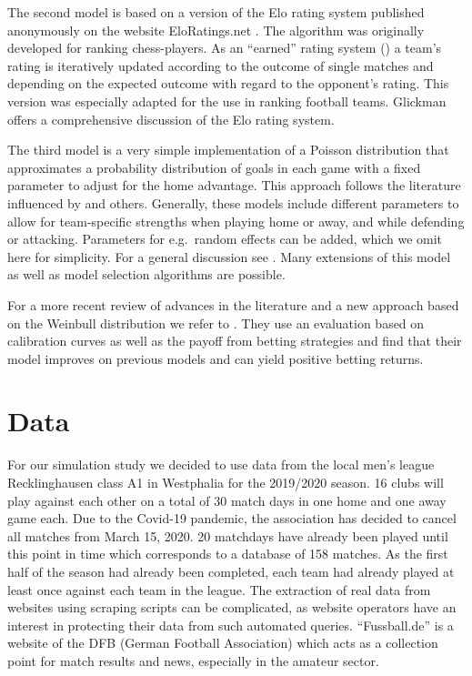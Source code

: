\documentclass[12pt,a4paper]{article}
\begin{document}
The second model is based on a version of the Elo rating system
published anonymously on the website EloRatings.net
\autocite*{eloratings}. The algorithm was originally developed for
ranking chess-players. As an \enquote{earned} rating system
(\textcite{lasek2013}) a team's rating is iteratively updated according
to the outcome of single matches and depending on the expected outcome
with regard to the opponent's rating. This version was especially
adapted for the use in ranking football teams. Glickman
\autocite*{glickman1995} offers a comprehensive discussion of the Elo
rating system.

The third model is a very simple implementation of a Poisson
distribution that approximates a probability distribution of goals in
each game with a fixed parameter to adjust for the home advantage. This
approach follows the literature influenced by \textcite{maher1982} and
others. Generally, these models include different parameters to allow
for team-specific strengths when playing home or away, and while
defending or attacking. Parameters for e.g.~random effects can be added,
which we omit here for simplicity. For a general discussion see
\textcite{karlis2003}. Many extensions of this model as well as model
selection algorithms are possible.

For a more recent review of advances in the literature and a new
approach based on the Weinbull distribution we refer to
\textcite{boshnakov2017}. They use an evaluation based on calibration
curves as well as the payoff from betting strategies and find that their
model improves on previous models and can yield positive betting
returns.

\hypertarget{data}{%
\section{Data}\label{data}}

For our simulation study we decided to use data from the local men's
league Recklinghausen class A1 in Westphalia for the 2019/2020 season.
16 clubs will play against each other on a total of 30 match days in one
home and one away game each. Due to the Covid-19 pandemic, the
association has decided to cancel all matches from March 15, 2020. 20
matchdays have already been played until this point in time which
corresponds to a database of 158 matches. As the first half of the
season had already been completed, each team had already played at least
once against each team in the league. The extraction of real data from
websites using scraping scripts can be complicated, as website operators
have an interest in protecting their data from such automated queries.
\enquote{Fussball.de} is a website of the DFB (German Football
Association) which acts as a collection point for match results and
news, especially in the amateur sector.
\end{document}
